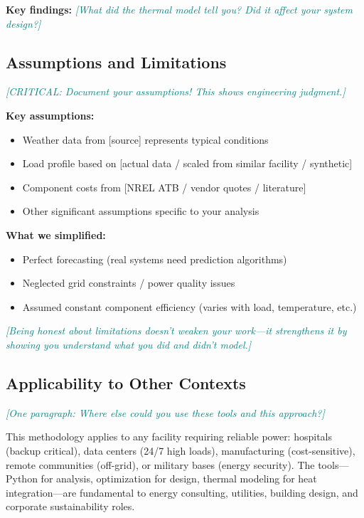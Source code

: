 \documentclass[11pt,letterpaper]{article}
\newcommand{\hint}[1]{\textcolor{teal}{\small\textit{[#1]}}}
\begin{document}
\textbf{Key findings:} \hint{What did the thermal model tell you? Did it affect your system design?}

\subsection{Assumptions and Limitations}

\hint{CRITICAL: Document your assumptions! This shows engineering judgment.}

\textbf{Key assumptions:}
\begin{itemize}
    \item Weather data from [source] represents typical conditions
    \item Load profile based on [actual data / scaled from similar facility / synthetic]
    \item Component costs from [NREL ATB / vendor quotes / literature]
    \item Other significant assumptions specific to your analysis
\end{itemize}

\textbf{What we simplified:}
\begin{itemize}
    \item Perfect forecasting (real systems need prediction algorithms)
    \item Neglected grid constraints / power quality issues
    \item Assumed constant component efficiency (varies with load, temperature, etc.)
\end{itemize}

\hint{Being honest about limitations doesn't weaken your work—it strengthens it by showing you understand what you did and didn't model.}

\subsection{Applicability to Other Contexts}

\hint{One paragraph: Where else could you use these tools and this approach?}

This methodology applies to any facility requiring reliable power: hospitals (backup critical), data centers (24/7 high loads), manufacturing (cost-sensitive), remote communities (off-grid), or military bases (energy security). The tools—Python for analysis, optimization for design, thermal modeling for heat integration—are fundamental to energy consulting, utilities, building design, and corporate sustainability roles.
\end{document}

